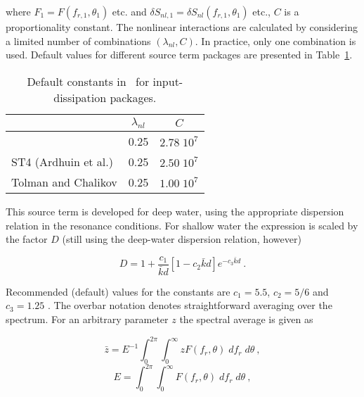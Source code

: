 \noindent
where $F_1 = F(f_{r,1} ,\theta_1 )$ etc. and $\delta S_{nl,1} = \delta
S_{nl}(f_{r,1} ,\theta_1 )$ etc., $C$ is a proportionality constant. The
nonlinear interactions are calculated by considering a limited number of
combinations $(\lambda_{nl},C)$. In practice, only one combination is
used. Default values for different source term packages are presented in
Table~\ref{tab:snl_par}.



\begin{table} \begin{center}
 \begin{tabular}{|l|c|c|} \hline \hline
                    & $\lambda_{nl}$ &     $C$      \\ \hline
\wam-3              &      0.25      & $2.78 \; 10^7$  \\ \hline
ST4 (Ardhuin et al.)&      0.25      & $2.50 \; 10^7$  \\ \hline
Tolman and Chalikov &      0.25      & $1.00 \; 10^7$  \\ \hline \hline
\end{tabular} \end{center}
\caption{Default constants in \dia\ for input-dissipation packages.}
\label{tab:snl_par} \botline \end{table}

This source term is developed for deep water, using the appropriate dispersion
relation in the resonance conditions. For shallow water the expression is
scaled by the factor $D$ (still using the deep-water dispersion relation,
however)


\begin{equation}
D = 1 + \frac{c_1}{\bar{k}d} \left [ 1 - c_2 \bar{k} d
\right ] e^{-c_3 \bar{k} d} \: . \label{eq:snl_shal}
\end{equation}

\noindent
Recommended (default) values for the constants are $c_1=5.5$, $c_2=5/6$ and
$c_3=1.25$ \citep{art:Hea85a}. The overbar notation denotes straightforward
averaging over the spectrum. For an arbitrary parameter $z$ the spectral average
is given as


\begin{equation}
\bar{z} = E^{-1} \int_{0}^{2\pi} \int_{0}^{\infty}
z F(f_r,\theta) \; d f_r \; d\theta \: , \label{eq:zbar}
\end{equation}
\begin{equation}
E = \int_{0}^{2\pi} \int_{0}^{\infty}
F(f_r,\theta) \; d f_r \; d\theta \: , \label{eq:etot}
\end{equation}

